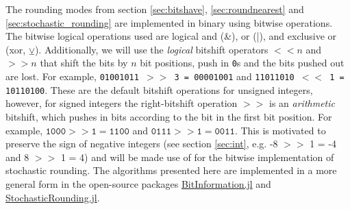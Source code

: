 The rounding modes from section \ref{sec:bitshave}, \ref{sec:roundnearest} and \ref{sec:stochastic_rounding} are 
implemented in binary using bitwise operations. The bitwise logical operations used are logical and (\&), or (|), and
exclusive or (xor, $\veebar$). Additionally, we will use the \emph{logical} bitshift operators $<< n$ and $>> n$ that shift the
bits by $n$ bit positions, push in \texttt{0}s and the bits pushed out are lost. For example, \texttt{01001011 $>$$>$ 3 = 00001001}
and \texttt{11011010 $<$$<$ 1 = 10110100}. These are the default bitshift operations for unsigned integers, however,
for signed integers the right-bitshift operation $>>$ is an \emph{arithmetic} bitshift, which pushes in bits according to the
bit in the first bit position. For example, $\mathtt{1000} >> \mathtt{1} = \mathtt{1100}$ and
$\mathtt{0111} >> \mathtt{1} = \mathtt{0011}$. This is motivated to preserve the sign of negative integers (see section \ref{sec:int},
e.g. -8 $>>$ 1 = -4 and 8 $>>$ 1 = 4) and will be made use of for the bitwise implementation of stochastic rounding. The algorithms
presented here are implemented in a more general form in the open-source packages \href{https://github.com/milankl/BitInformation.jl}{BitInformation.jl}
and \href{https://github.com/milankl/StochasticRounding.jl}{StochasticRounding.jl}.

